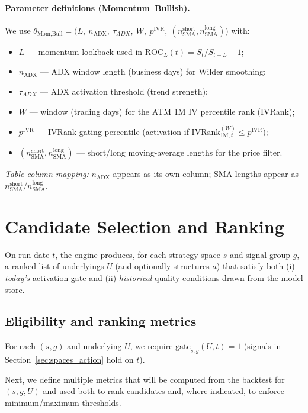 \documentclass[12pt,a4paper]{report}
\begin{document}
\paragraph{Parameter definitions (Momentum–Bullish).}
We use $\theta_{\text{Mom,Bull}}=\big(L,\ n_{\mathrm{ADX}},\ \tau_{\!ADX},\ W,\ p^{\text{IVR}},\ (n_{\text{SMA}}^{\text{short}},n_{\text{SMA}}^{\text{long}})\big)$ with:
\begin{itemize}
    \item $L$ — momentum lookback used in $\mathrm{ROC}_{L}(t)=S_t/S_{t-L}-1$;
    \item $n_{\mathrm{ADX}}$ — ADX window length (business days) for Wilder smoothing;
    \item $\tau_{\!ADX}$ — ADX activation threshold (trend strength);
    \item $W$ — window (trading days) for the ATM 1M IV percentile rank (IVRank);
    \item $p^{\text{IVR}}$ — IVRank gating percentile (activation if $\text{IVRank}^{(W)}_{1\mathrm{M},t}\le p^{\text{IVR}}$);
    \item $(n_{\text{SMA}}^{\text{short}},n_{\text{SMA}}^{\text{long}})$ — short/long moving-average lengths for the price filter.
\end{itemize}
\noindent\textit{Table column mapping:} $n_{\mathrm{ADX}}$ appears as its own column; SMA lengths appear as $n_{\text{SMA}}^{\text{short}}/n_{\text{SMA}}^{\text{long}}$.

\section{Candidate Selection and Ranking}
\label{sec:selection_ranking}

On run date $t$, the engine produces, for each strategy space $s$ and signal group $g$, a ranked list of underlyings $U$ (and optionally structures $a$) that satisfy both (i) \emph{today’s} activation gate and (ii) \emph{historical} quality conditions drawn from the model store.

\subsection{Eligibility and ranking metrics}
For each $(s,g)$ and underlying $U$, we require $\text{gate}_{s,g}(U,t)=1$ (signals in Section~\ref{sec:spaces_action} hold on $t$).

Next, we define multiple metrics that will be computed from the backtest for $(s,g,U)$ and used both to rank candidates and, where indicated, to enforce minimum/maximum thresholds.
\end{document}
